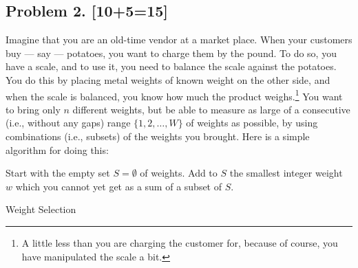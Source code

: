 \documentclass[10pt]{article}
\begin{document}

\subsection*{Problem 2. [10+5=15]}
  Imagine that you are an old-time vendor at a market place. When your customers buy --- say --- potatoes, you want to charge them by the pound.
  To do so, you have a scale, and to use it, you need to balance the scale against the potatoes. You do this by placing metal weights of known weight on the other side, and when the scale is balanced, you know how much the product weighs.\footnote{A little less than you are charging the customer for, because of course, you have manipulated the scale a bit.}
  You want to bring only $n$ different weights, but be able to measure as large of a consecutive (i.e., without any gaps) range $\{1, 2, \ldots, W\}$ of weights as possible, by using combinations (i.e., subsets) of the weights you brought. Here is a simple algorithm for doing this:

  \begin{algorithm}[htb]
  \begin{algorithmic}
    \STATE Start with the empty set $S = \emptyset$ of weights.
       \STATE Add to $S$ the smallest integer weight $w$ which you cannot yet get as a sum of a subset of $S$.
    \ENDFOR
  \end{algorithmic}
\caption{Weight Selection \label{alg:weights}}
\end{algorithm}
\end{document}
